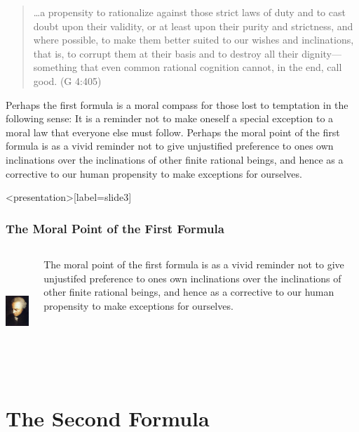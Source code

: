 \begin{quote}
	\ldots a propensity to rationalize against those strict laws of duty and to cast doubt upon their validity, or at least upon their purity and strictness, and where possible, to make them better suited to our wishes and inclinations, that is, to corrupt them at their basis and to destroy all their dignity---something that even common rational cognition cannot, in the end, call good. (G 4:405)
\end{quote}

Perhaps the first formula is a moral compass for those lost to temptation in the following sense: It is a reminder not to make oneself a special exception to a moral law that everyone else must follow. Perhaps the moral point of the first formula is as a vivid reminder not to give unjustified preference to ones own inclinations over the inclinations of other finite rational beings, and hence as a corrective to our human propensity to make exceptions for ourselves. \change

\begin{frame}<presentation>[label=slide3]
    \frametitle{The Moral Point of the First Formula}
        \begin{columns}
            \begin{column}{3cm}
                \includegraphics[height=4cm]{../../graphics/kant.jpg}
            \end{column}
            \begin{column}{7cm}
                \alert{The moral point of the first formula is as a vivid reminder not to give unjustifed preference to ones own inclinations over the inclinations of other finite rational beings, and hence as a corrective to our human propensity to make exceptions for ourselves.} 
            \end{column}
        \end{columns}
\end{frame}


\section{The Second Formula}\label{sec:the_second_formula} %

